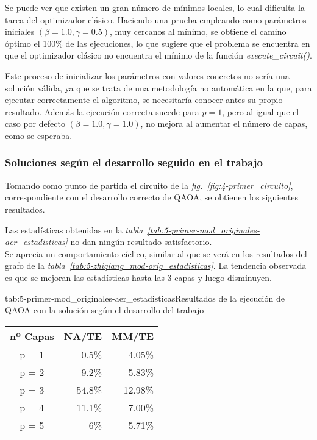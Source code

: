 Se puede ver que existen un gran número de mínimos locales, lo cual dificulta la tarea del optimizador clásico.
Haciendo una prueba empleando como parámetros iniciales $(\beta = 1.0, \gamma = 0.5)$, muy cercanos al mínimo, se obtiene el camino óptimo el 100\% de las ejecuciones, lo que sugiere que el problema se encuentra en que el optimizador clásico no encuentra el mínimo de la función \textit{execute\_circuit()}.

Este proceso de inicializar los parámetros con valores concretos no sería una solución válida, ya que se trata de una metodología no automática en la que, para ejecutar correctamente el algoritmo, se necesitaría conocer antes su propio resultado. Además la ejecución correcta sucede para $p = 1$, pero al igual que el caso por defecto $(\beta = 1.0, \gamma = 1.0)$, no mejora al aumentar el número de capas, como se esperaba.

\subsubsection{Soluciones según el desarrollo seguido en el trabajo}

Tomando como punto de partida el circuito de la \textit{fig.~\ref{fig:4-primer_circuito}}, correspondiente con el desarrollo correcto de QAOA, se obtienen los siguientes resultados.

Las estadísticas obtenidas en la \textit{tabla~\ref{tab:5-primer-mod_originales-aer_estadisticas}} no dan ningún resultado satisfactorio.
\\
Se aprecia un comportamiento cíclico, similar al que se verá en los resultados del grafo de la \textit{tabla~\ref{tab:5-zhiqiang_mod-orig_estadisticas}}.
La tendencia observada es que se mejoran las estadísticas hasta las 3 capas y luego disminuyen.

\begin{table}[Resultados QAOA {--} artículo de Urgelles \textit{et al.} (2022) {--} implementación de QAOA]{tab:5-primer-mod_originales-aer_estadisticas}{Resultados de la ejecución de QAOA con la solución según el desarrollo del trabajo}
  \centering
  \begin{tabular}{|c|r|r|}
    \hline
    \textbf{nº Capas} & \textbf{NA/TE} & \textbf{MM/TE} \\ \hline
    p = 1 &  0.5\% &  4.05\% \\ \hline
    p = 2 &  9.2\% &  5.83\% \\ \hline
    p = 3 & 54.8\% & 12.98\% \\ \hline
    p = 4 & 11.1\% &  7.00\% \\ \hline
    p = 5 &    6\% &  5.71\% \\ \hline
  \end{tabular}
\end{table}


